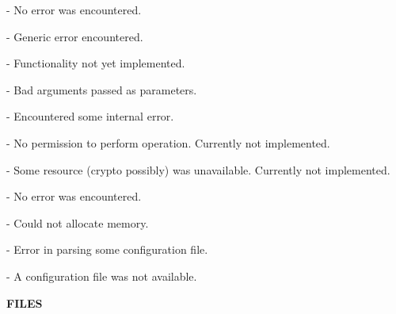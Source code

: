 \begin{description}

\item {}

\begin{description}

\item {} - No error was encountered.

\item {} - Generic error encountered.

\item {} - Functionality not yet implemented.

\item {} - Bad arguments passed as parameters.

\item {} - Encountered some internal error.

\item {} - No permission to perform operation.
Currently not implemented.

\item {} - Some resource (crypto possibly) was
unavailable.  Currently not implemented.

\end{description}

\item {}

\begin{description}

\item {} - No error was encountered.

\item {} - Could not allocate memory.

\item {} - Error in parsing some configuration
file.

\item {} - A configuration file was not available.

\end{description}

\end{description}

{\bf FILES}

